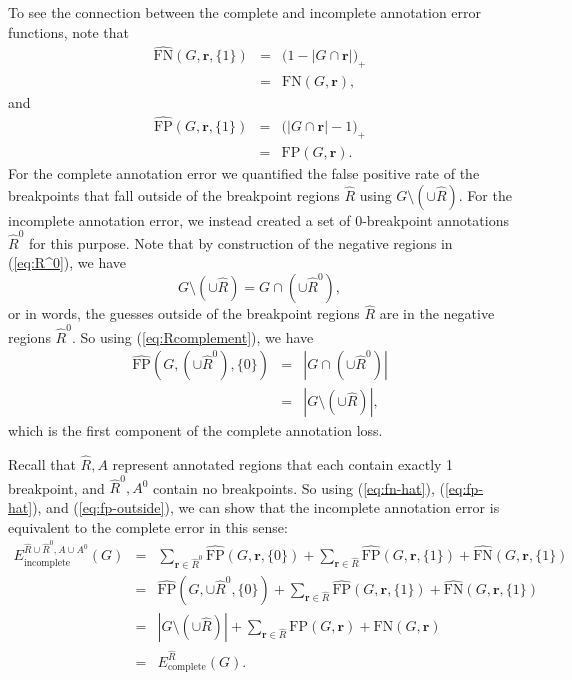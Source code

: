 \documentclass{jsfds} %
\renewcommand{\r}{ \mathbf{ r} }
\begin{document}
To see the connection between the complete and incomplete annotation
error functions, note that
\begin{eqnarray}
\nonumber  \hat{\text{FN}}(G,\r,\{1\}) 
&=&   \big(
1-|G\cap\r|
\big)_+\\
&=&
\text{FN}(G,\r), \label{eq:fn-hat}
\end{eqnarray}
and
\begin{eqnarray}
\nonumber
  \hat{\text{FP}}(G,\r,\{1\}) 
&=&
\big( 
|G\cap\r|-1
\big)_+\\
&=& \text{FP}(G,\r). \label{eq:fp-hat}
\end{eqnarray}
For the complete annotation error we quantified the false positive
rate of the breakpoints that fall outside of the breakpoint regions
$\hat R$ using $G\setminus(\cup \hat R)$. For the incomplete
annotation error, we instead created a set of 0-breakpoint annotations
$\hat R^0$ for this purpose. Note that by construction of the negative
regions in (\ref{eq:R^0}), we have 
\begin{equation}
  \label{eq:Rcomplement}
  G\setminus \left(\cup \hat R\right)
 = 
G\cap\left(\cup \hat R^0 \right),
\end{equation}
or in words, the guesses outside of the breakpoint regions $\hat R$
are in the negative regions $\hat R^0$. So using
(\ref{eq:Rcomplement}), we have
\begin{eqnarray}
  \hat{\text{FP}}(G,(\cup \hat R^0),\{0\})
&=& 
|G\cap(
  \cup \hat R^0
)|\nonumber
\\
&=&
|G\setminus(\cup\hat R)|,\label{eq:fp-outside}
\end{eqnarray}
which is the first component of the complete annotation loss.



Recall that $\hat R,A$ represent annotated regions that each contain
exactly 1 breakpoint, and $\hat R^0,A^0$ contain no breakpoints. So
using (\ref{eq:fn-hat}), (\ref{eq:fp-hat}), and
(\ref{eq:fp-outside}), we can show that the incomplete annotation error
is equivalent to the complete error in this sense:
\begin{eqnarray}
  E_{\text{incomplete}}^{\hat R\cup \hat R^0,A\cup A^0}(G)
&=&
\sum_{\r\in \hat R^0} \hat{\text{FP}}(G,\r,\{0\})\nonumber 
+
\sum_{\r\in\hat R} \hat{\text{FP}}(G,\r,\{1\}) + \hat{\text{FN}}(G,\r,\{1\})
 \\
&=&
 \hat{\text{FP}}(G,\cup \hat R^0,\{0\})\nonumber 
+
\sum_{\r\in\hat R} \hat{\text{FP}}(G,\r,\{1\}) + \hat{\text{FN}}(G,\r,\{1\})
 \\
&=&
|G\setminus(\cup\hat R)|
+\nonumber
\sum_{\r\in\hat R} {\text{FP}}(G,\r) + {\text{FN}}(G,\r)\\
&=&
E^{\hat R}_{\text{complete}}(G).
\end{eqnarray}
\end{document}
